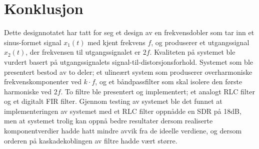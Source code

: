 \section{Konklusjon}
\label{konklusjon}

Dette designnotatet har tatt for seg et design av en frekvensdobler som 
tar inn et sinus-formet signal $x_1(t)$ med kjent frekvens $f$, og produserer et utgangssignal 
$x_2(t)$, der frekvensen til utgangssignalet er $2f$. Kvaliteten på systemet
ble vurdert basert på utgangssignalets signal-til-distorsjonsforhold. Systemet som ble 
presentert bestod av to deler; et ulineært system som produserer overharmoniske frekvenskomponenter ved 
$k \cdot f$, og et båndpassfilter som skal isolere den første harmoniske ved $2f$. To 
filtre ble presentert og implementert; et analogt RLC filter og et digitalt FIR filter.
Gjennom testing av systemet ble det funnet at implementeringen av systemet med et RLC filter 
oppnådde en SDR på 18dB, men at systemet trolig kan oppnå bedre resultater dersom realiserte 
komponentverdier hadde hatt mindre avvik fra de ideelle verdiene, og dersom orderen på kaskadekoblingen 
av filtre hadde vært større.

